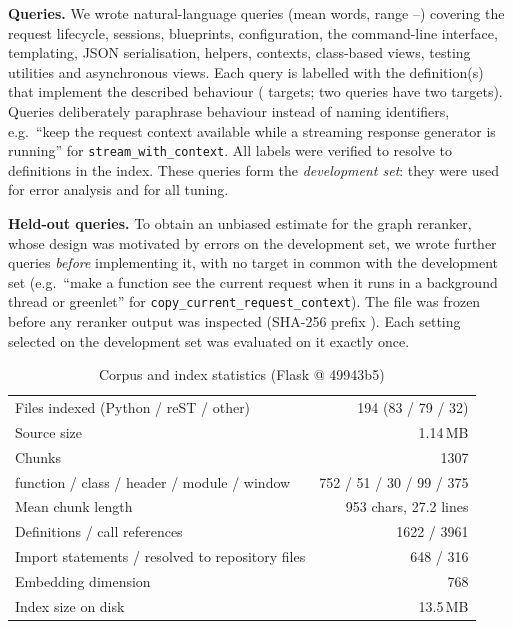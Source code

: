 \documentclass[conference]{IEEEtran}
\begin{document}
\textbf{Queries.} We wrote \NQueries{} natural-language queries (mean
\QWords{} words, range \QWordsMin{}--\QWordsMax{}) covering the request
lifecycle, sessions, blueprints, configuration, the command-line interface,
templating, JSON serialisation, helpers, contexts, class-based views, testing
utilities and asynchronous views. Each query is labelled with the definition(s)
that implement the described behaviour (\NTargets{} targets; two queries have
two targets). Queries deliberately paraphrase behaviour instead of naming
identifiers, e.g.\ ``keep the request context available while a streaming
response generator is running'' for \texttt{stream\_with\_context}. All labels
were verified to resolve to definitions in the index. These \NQueries{} queries
form the \emph{development set}: they were used for error analysis and for all
tuning.

\textbf{Held-out queries.} To obtain an unbiased estimate for the graph
reranker, whose design was motivated by errors on the development set, we wrote
\HoQueries{} further queries \emph{before} implementing it, with no target in
common with the development set (e.g.\ ``make a function see the current
request when it runs in a background thread or greenlet'' for
\texttt{copy\_current\_request\_context}). The file was frozen before any
reranker output was inspected (SHA-256 prefix \texttt{\HoSha}). Each setting
selected on the development set was evaluated on it exactly once.

\begin{table}[t]
\centering
\caption{Corpus and index statistics (Flask @ 49943b5)}
\label{tab:data}
\begin{tabular}{@{}lr@{}}
\toprule
Files indexed (Python / reST / other) & 194 (83 / 79 / 32) \\
Source size & 1.14\,MB \\
Chunks & 1307 \\
\quad function / class / header / module / window & 752 / 51 / 30 / 99 / 375 \\
Mean chunk length & 953 chars, 27.2 lines \\
Definitions / call references & 1622 / 3961 \\
Import statements / resolved to repository files & 648 / 316 \\
Embedding dimension & 768 \\
Index size on disk & 13.5\,MB \\
\bottomrule
\end{tabular}
\end{table}
\end{document}
